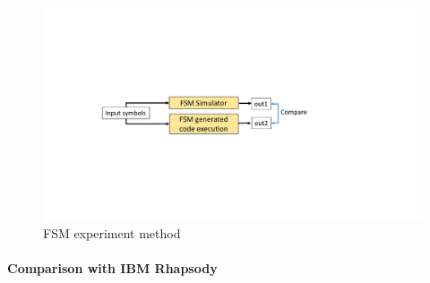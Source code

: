\begin{figure}
	\centering
	\includegraphics[clip, trim=6.5cm 7.3cm 10.25cm 7.7cm, width=0.85\columnwidth]{figures/fsm}
	\caption{FSM experiment method} 
	\label{fig:fsm}
\end{figure}

\paragraph{Comparison with IBM Rhapsody}





